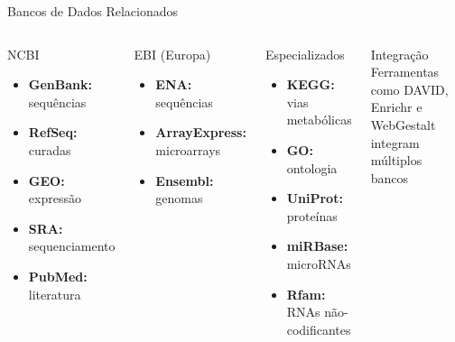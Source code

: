 \begin{frame}{Bancos de Dados Relacionados}
\begin{columns}
\begin{block}{NCBI}
\begin{itemize}
    \item \textbf{GenBank:} sequências
    \item \textbf{RefSeq:} curadas
    \item \textbf{GEO:} expressão
    \item \textbf{SRA:} sequenciamento
    \item \textbf{PubMed:} literatura
\end{itemize}
\end{block}

\vspace{0.3cm}

\begin{block}{EBI (Europa)}
\begin{itemize}
    \item \textbf{ENA:} sequências
    \item \textbf{ArrayExpress:} microarrays
    \item \textbf{Ensembl:} genomas
\end{itemize}
\end{block}

\begin{block}{Especializados}
\begin{itemize}
    \item \textbf{KEGG:} vias metabólicas
    \item \textbf{GO:} ontologia
    \item \textbf{UniProt:} proteínas
    \item \textbf{miRBase:} microRNAs
    \item \textbf{Rfam:} RNAs não-codificantes
\end{itemize}
\end{block}

\vspace{0.3cm}

\begin{exampleblock}{Integração}
Ferramentas como DAVID, Enrichr e WebGestalt integram múltiplos bancos
\end{exampleblock}
\end{columns}
\end{frame}

